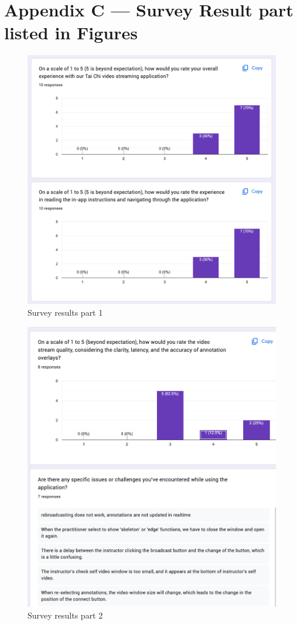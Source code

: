 \documentclass[12pt, titlepage]{article}
\begin{document}
\section*{Appendix C --- Survey Result part listed in Figures}
\FloatBarrier
\begin{figure}[!]
  \centering
  \includegraphics[width=1.0\linewidth]{surveyp1.png}
  \caption{Survey results part 1}
  \label{fig:surveyp1}
\end{figure}

\begin{figure}[!]
  \centering
  \includegraphics[width=1.0\linewidth]{surveyp2.png}
  \caption{Survey results part 2}
  \label{fig:surveyp2}
\end{figure}
\end{document}
